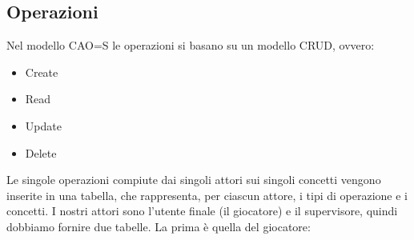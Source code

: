 \documentclass[../Report.tex]{subfiles}
\begin{document}
    \subsection{Operazioni}
    Nel modello CAO=S le operazioni si basano su un modello CRUD, ovvero:
    \begin{itemize}
        \item Create
        \item Read
        \item Update
        \item Delete
    \end{itemize}
    Le singole operazioni compiute dai singoli attori sui singoli concetti vengono inserite in una tabella, che rappresenta, per ciascun attore, i tipi di operazione e i concetti. I nostri attori sono l'utente finale (il giocatore) e il supervisore, quindi dobbiamo fornire due tabelle. La prima è quella del giocatore:
\end{document}
